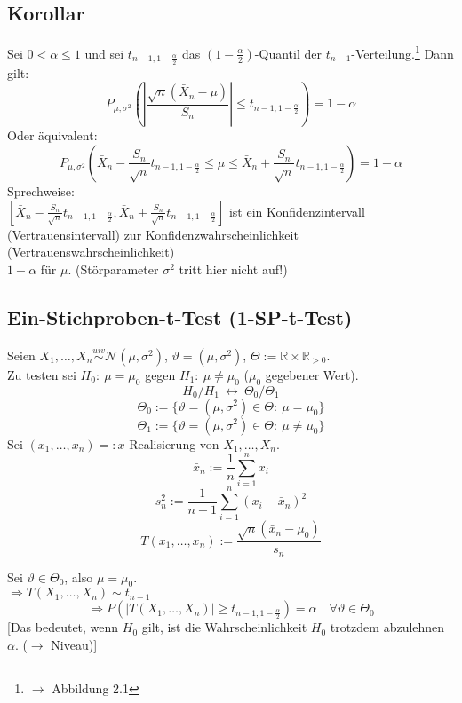 \documentclass[a4paper,11pt,twoside,titlepage]{article}
\newcommand{\R}{{\mathbb R}}
\newcommand\NN{ \mathcal{N} } %
\newcommand{\uiv}{\ensuremath{\stackrel{uiv}{\sim}}}
\begin{document}
\subsection{Korollar}
Sei $0<\alpha\leq 1$ und sei $t_{n-1,1-\frac\alpha2}$ das $(1-\frac\alpha2)$-Quantil der $t_{n-1}$-Verteilung.\footnote{$\rightarrow$ Abbildung 2.1} Dann gilt:
\[P_{\mu,\sigma^2}\left(\left|\frac{\sqrt n(\bar X_n-\mu)}{S_n}\right|\leq t_{n-1,1-\frac\alpha2}\right)=1-\alpha\]
Oder äquivalent:
\[P_{\mu,\sigma^2}\left(\bar X_n-\frac{S_n}{\sqrt n}t_{n-1,1-\frac\alpha2}\leq\mu\leq\bar X_n+\frac{S_n}{\sqrt{n}} t_{n-1,1-\frac\alpha2}\right)=1-\alpha\]
Sprechweise:\\
$[\bar X_n-\frac{S_n}{\sqrt n}t_{n-1,1-\frac\alpha2},\bar X_n+\frac{S_n}{\sqrt{n}} t_{n-1,1-\frac\alpha2}]$ ist ein Konfidenzintervall (Vertrauensintervall) zur Konfidenzwahrscheinlichkeit (Vertrauenswahrscheinlichkeit)\\ $1-\alpha$ für $\mu$. (Störparameter $\sigma^2$ tritt hier nicht auf!)

\subsection{Ein-Stichproben-t-Test (1-SP-t-Test)}
Seien $X_1,\ldots,X_n\uiv\NN(\mu,\sigma^2)$, $\vartheta=(\mu,\sigma^2)$, $\Theta:=\R\times\R_{>0}$.\\
Zu testen sei $H_0:\ \mu=\mu_0$ gegen $H_1:\ \mu\neq\mu_0$ ($\mu_0$ gegebener Wert).
\[H_0/H_1\ \leftrightarrow\ \Theta_0/\Theta_1\]
\[\Theta_0:=\{\vartheta=(\mu,\sigma^2)\in\Theta:\ \mu=\mu_0\}\]
\[\Theta_1:=\{\vartheta=(\mu,\sigma^2)\in\Theta:\ \mu\neq\mu_0\}\]
Sei $(x_1,\ldots,x_n)=:x$ Realisierung von $X_1,\ldots,X_n$.
\[\bar x_n:=\frac1n\sum_{i=1}^nx_i\]
\[s_n^2:=\frac{1}{n-1}\sum_{i=1}^n(x_i-\bar x_n)^2\]
\[T(x_1,\ldots,x_n):=\frac{\sqrt n(\bar x_n-\mu_0)}{s_n}\]


Sei $\vartheta\in\Theta_0$, also $\mu=\mu_0$.\\
$\Rightarrow T(X_1,\ldots,X_n)\sim t_{n-1}$
\[\Rightarrow P(|T(X_1,\ldots,X_n)|\geq t_{n-1,1-\frac\alpha2})=\alpha\quad\forall\vartheta\in\Theta_0\]
[Das bedeutet, wenn $H_0$ gilt, ist die Wahrscheinlichkeit $H_0$ trotzdem abzulehnen $\alpha$. ($\rightarrow$ Niveau)]
\end{document}
